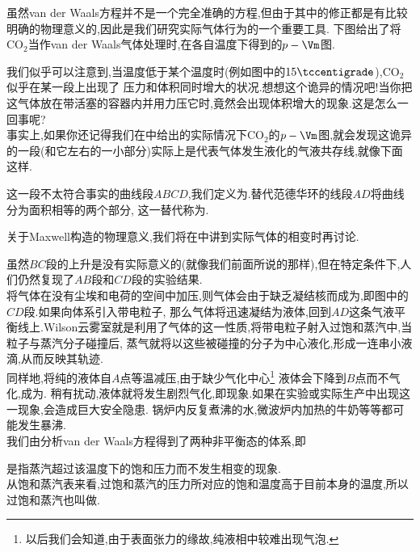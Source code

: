 \documentclass{ctexart}
\begin{document}
\indent 虽然van der Waals方程并不是一个完全准确的方程,但由于其中的修正都是有比较明确的物理意义的,因此是我们研究实际气体行为的一个重要工具.%
下图给出了将$\text{CO}_2$当作van der Waals气体处理时,在各自温度下得到的$p-\Vm$图.
\begin{figure}[H]
    \centering
\end{figure}
\indent 我们似乎可以注意到,当温度低于某个温度时(例如图中的$15\tccentigrade$),$\text{CO}_2$似乎在某一段上出现了%
压力和体积同时增大的状况.想想这个诡异的情况吧!当你把这气体放在带活塞的容器内并用力压它时,竟然会出现体积增大的现象.这是怎么一回事呢?\\
\indent 事实上,如果你还记得我们在中给出的实际情况下$\text{CO}_2$的$p-\Vm$图,就会发现这诡异的一段(和它左右的一小部分)实际上是代表气体发生液化的气液共存线,就像下面这样.
\begin{figure}[H]
    \centering
\end{figure}
\indent 这一段不太符合事实的曲线段$ABCD$,我们定义为.替代范德华环的线段$AD$将曲线分为面积相等的两个部分,%
这一替代称为.
\begin{hint}
    关于Maxwell构造的物理意义,我们将在中讲到实际气体的相变时再讨论.
\end{hint}
虽然$BC$段的上升是没有实际意义的(就像我们前面所说的那样),但在特定条件下,人们仍然复现了$AB$段和$CD$段的实验结果.\\
\indent 将气体在没有尘埃和电荷的空间中加压,则气体会由于缺乏凝结核而成为,即图中的$CD$段.如果向体系引入带电粒子,%
那么气体将迅速凝结为液体,回到$AD$这条气液平衡线上.Wilson云雾室就是利用了气体的这一性质,将带电粒子射入过饱和蒸汽中,当粒子与蒸汽分子碰撞后,%
蒸气就将以这些被碰撞的分子为中心液化,形成一连串小液滴,从而反映其轨迹.\\
\indent 同样地,将纯的液体自$A$点等温减压,由于缺少气化中心\footnote{以后我们会知道,由于表面张力的缘故,纯液相中较难出现气泡.}%
液体会下降到$B$点而不气化,成为.%
稍有扰动,液体就将发生剧烈气化,即现象.如果在实验或实际生产中出现这一现象,会造成巨大安全隐患. %
锅炉内反复煮沸的水,微波炉内加热的牛奶等等都可能发生暴沸.\\
\indent 我们由分析van der Waals方程得到了两种非平衡态的体系,即
\begin{definition}[1C.3.2 过饱和蒸汽]
    是指蒸汽超过该温度下的饱和压力而不发生相变的现象.\\
    从饱和蒸汽表来看,过饱和蒸汽的压力所对应的饱和温度高于目前本身的温度,所以过饱和蒸汽也叫做.
\end{definition}
\end{document}
